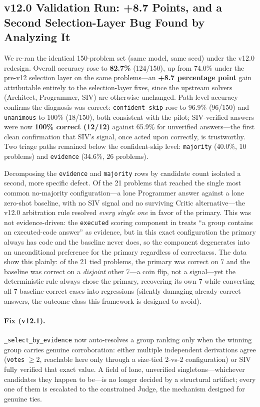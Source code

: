 \documentclass[11pt,a4paper]{article}
\begin{document}
\subsection{v12.0 Validation Run: +8.7 Points, and a Second Selection-Layer Bug Found by Analyzing It}
\label{sec:v12_validation}
We re-ran the identical 150-problem set (same model, same seed) under the v12.0 redesign.
Overall accuracy rose to \textbf{82.7\%} (124/150), up from 74.0\% under the pre-v12 selection layer on the same problems---an \textbf{+8.7 percentage point} gain attributable entirely to the selection-layer fixes, since the upstream solvers (Architect, Programmer, SIV) are otherwise unchanged.
Path-level accuracy confirms the diagnosis was correct: \texttt{confident\_skip} rose to 96.9\% (96/150) and \texttt{unanimous} to 100\% (18/150), both consistent with the pilot; SIV-verified answers were now \textbf{100\% correct (12/12)} against 65.9\% for unverified answers---the first clean confirmation that SIV's signal, once acted upon correctly, is trustworthy.
Two triage paths remained below the confident-skip level: \texttt{majority} (40.0\%, 10 problems) and \texttt{evidence} (34.6\%, 26 problems).

Decomposing the \texttt{evidence} and \texttt{majority} rows by candidate count isolated a second, more specific defect.
Of the 21 problems that reached the single most common no-majority configuration---a lone Programmer answer against a lone zero-shot baseline, with no SIV signal and no surviving Critic alternative---the v12.0 arbitration rule resolved \emph{every single one} in favor of the primary.
This was not evidence-driven: the \texttt{executed} scoring component in  treats ``a group contains an executed-code answer'' as evidence, but in this exact configuration the primary always has code and the baseline never does, so the component degenerates into an unconditional preference for the primary regardless of correctness.
The data show this plainly: of the 21 tied problems, the primary was correct on 7 and the baseline was correct on a \emph{disjoint} other 7---a coin flip, not a signal---yet the deterministic rule always chose the primary, recovering its own 7 while converting all 7 baseline-correct cases into regressions (silently damaging already-correct answers, the outcome class this framework is designed to avoid).
\paragraph{Fix (v12.1).} \texttt{\_select\_by\_evidence} now auto-resolves a group ranking only when the winning group carries genuine corroboration: either multiple independent derivations agree (\texttt{votes} $\geq 2$, reachable here only through a size-tied 2-vs-2 configuration) or SIV fully verified that exact value. A field of lone, unverified singletons---whichever candidates they happen to be---is no longer decided by a structural artifact; every one of them is escalated to the constrained Judge, the mechanism designed for genuine ties.
\end{document}
